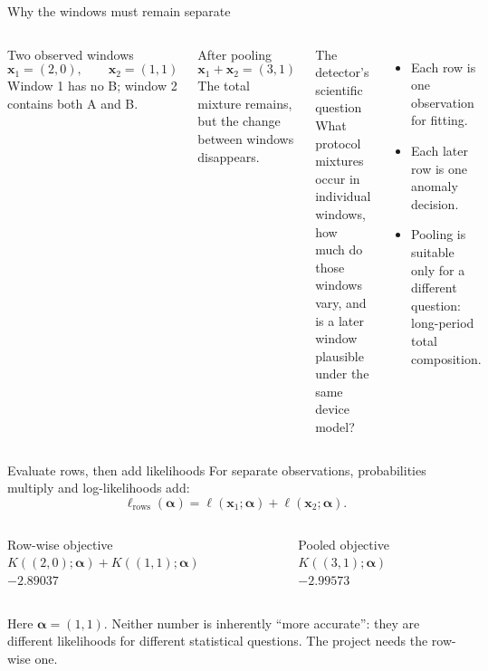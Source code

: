 \documentclass[aspectratio=169,10pt]{beamer}
\begin{document}
\begin{frame}{Why the windows must remain separate}
\begin{columns}[c,onlytextwidth]
\begin{block}{Two observed windows}
\[
\mathbf{x}_1=(2,0),
\qquad
\mathbf{x}_2=(1,1)
\]
Window 1 has no B; window 2 contains both A and B.
\end{block}

\begin{alertblock}{After pooling}
\[
\mathbf{x}_1+\mathbf{x}_2=(3,1)
\]
The total mixture remains, but the change between windows disappears.
\end{alertblock}

\begin{exampleblock}{The detector's scientific question}
What protocol mixtures occur in individual windows, how much do those windows
vary, and is a later window plausible under the same device model?
\end{exampleblock}

\begin{itemize}
  \item Each row is one observation for fitting.
  \item Each later row is one anomaly decision.
  \item Pooling is suitable only for a different question: long-period total
  composition.
\end{itemize}
\end{columns}
\end{frame}

\begin{frame}{Evaluate rows, then add likelihoods}
For separate observations, probabilities multiply and log-likelihoods add:
\[
\ell_{\mathrm{rows}}(\boldsymbol{\alpha})
=\ell(\mathbf{x}_1;\boldsymbol{\alpha})
 +\ell(\mathbf{x}_2;\boldsymbol{\alpha}).
\]

\begin{columns}[T,onlytextwidth]
\begin{exampleblock}{Row-wise objective}
\centering
$K((2,0);\boldsymbol{\alpha})+K((1,1);\boldsymbol{\alpha})$\\[0.18cm]
\Large $-2.89037$
\end{exampleblock}

\begin{alertblock}{Pooled objective}
\centering
$K((3,1);\boldsymbol{\alpha})$\\[0.18cm]
\Large $-2.99573$
\end{alertblock}
\end{columns}

\vspace{0.25cm}
\small Here $\boldsymbol{\alpha}=(1,1)$. Neither number is inherently ``more
accurate'': they are different likelihoods for different statistical
questions. The project needs the row-wise one.
\end{frame}
\end{document}
